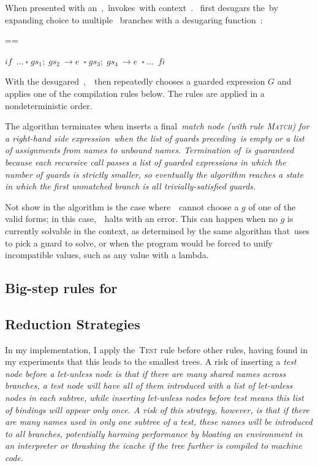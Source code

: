 \documentclass[manuscript,screen, 12pt, nonacm]{acmart}
\begin{document}
    When presented with an~\iffibf,~\DTran\~invokes~\Compile with context~\ctx.
    \Compile~first desugars the~\iffibf by expanding choice to multiple~\iffibf
    branches with a desugaring function~\ITran: 
    
    
    ==
    
    ${if\;~\dots~\square\; gs_{1};\; gs_{2}~\rightarrow e~\;\square\; gs_{3};\; gs_{4}~\rightarrow e~\;\square~\dots~\;fi}$

    With the desugared~\iffibf,~\Compile\ then repeatedly chooses a guarded
    expression $G$ and applies one of the compilation rules below. The rules are
    applied in a nondeterministic order. 

    The algorithm terminates when inserts a final~\it{match} node (with rule
    \textsc{Match}) for a right-hand side expression~\expr when the list of
    guards preceding~\expr is empty or a list of assignments from names to
    unbound names. Termination of~\DTran\~is guaranteed because each recursive
    call passes a list of guarded expressions in which the number of guards is
    strictly smaller, so eventually the algorithm reaches a state in which the
    first unmatched branch is all trivially-satisfied guards.


    Not show in the algorithm is the case where~\Compile\ cannot choose a $g$ of
    one of the valid forms; in this case,~\Compile\ halts with an error. This
    can happen when no $g$ is currently solvable in the context, as determined
    by the same algorithm that~\VMinus uses to pick a guard to solve, or when
    the program would be forced to unify incompatible values, such as any value
    with a lambda. 

      \subsection{Big-step rules for \Compile}
        \compiler

      \subsection{Reduction Strategies}

      In my implementation, I apply the~\textsc{Test} rule before other rules,
      having found in my experiments that this leads to the smallest trees. A
      risk of inserting a \it{test} node before a \it{let-unless} node is that
      if there are many shared names across branches, a \it{test} node will have
      all of them introduced with a list of \it{let-unless} nodes in each
      subtree, while inserting \it{let-unless} nodes before \it{test} means this
      list of bindings will appear only once. A risk of this strategy, however,
      is that if there are many names used in only one subtree of a \it{test},
      these names will be introduced to \it{all} branches, potentially harming
      performance by bloating an environment in an interpreter or thrashing the
      icache if the tree further is compiled to machine code. 
\end{document}
